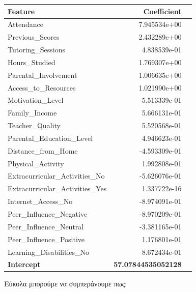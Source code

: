 \documentclass[12pt]{article}
\begin{document}
\begin{table}[ht]
\centering
\begin{tabular}{lrr}
\toprule
\textbf{Feature} & \textbf{Coefficient} \\
\midrule
Attendance                    & 7.945534e+00 \\
Previous\_Scores              & 2.432289e+00 \\
Tutoring\_Sessions            & 4.838539e-01 \\
Hours\_Studied                & 1.769307e+00 \\
Parental\_Involvement         & 1.006635e+00 \\
Access\_to\_Resources         & 1.021990e+00 \\
Motivation\_Level             & 5.513339e-01 \\
Family\_Income                & 5.666131e-01 \\
Teacher\_Quality              & 5.520568e-01 \\
Parental\_Education\_Level    & 4.946623e-01 \\
Distance\_from\_Home          & -4.593309e-01 \\
Physical\_Activity            & 1.992808e-01 \\
Extracurricular\_Activities\_No & -5.626076e-01 \\
Extracurricular\_Activities\_Yes & 1.337722e-16 \\
Internet\_Access\_No          & -8.974091e-01 \\
Peer\_Influence\_Negative     & -8.970209e-01 \\
Peer\_Influence\_Neutral      & -3.381165e-01 \\
Peer\_Influence\_Positive     & 1.176801e-01 \\
Learning\_Disabilities\_No    & 8.672434e-01 \\
\midrule
\textbf{Intercept} & \textbf{57.07844535052128} \\
\bottomrule
\end{tabular}
\label{tab:coefficients}
\end{table}

\noindent Εύκολα μπορούμε να συμπεράνουμε πως:\\
\end{document}
